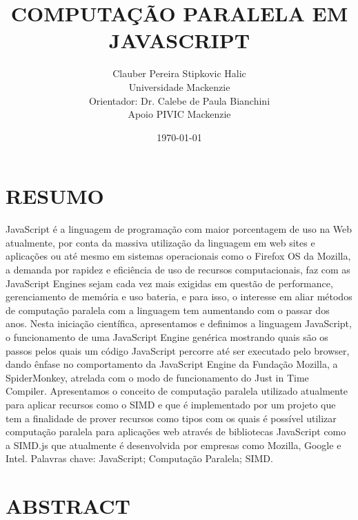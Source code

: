 \documentclass{article}
\begin{document}
\author{Clauber Pereira Stipkovic Halic\\
  Universidade Mackenzie\\
  Orientador: Dr. Calebe de Paula Bianchini\\
  Apoio PIVIC Mackenzie}
\date{\today}
\title{COMPUTAÇÃO PARALELA EM JAVASCRIPT}
\maketitle

\section{RESUMO}

JavaScript é a linguagem de programação com maior porcentagem de uso na Web
atualmente, por conta da massiva utilização da linguagem em web sites e aplicações ou até
mesmo em sistemas operacionais como o Firefox OS da Mozilla, a demanda por rapidez e
eficiência de uso de recursos computacionais, faz com as JavaScript Engines sejam cada
vez mais exigidas em questão de performance, gerenciamento de memória e uso bateria, e
para isso, o interesse em aliar métodos de computação paralela com a linguagem tem
aumentando com o passar dos anos. Nesta iniciação científica, apresentamos e definimos a
linguagem JavaScript, o funcionamento de uma JavaScript Engine genérica mostrando quais
são os passos pelos quais um código JavaScript percorre até ser executado pelo browser,
dando ênfase no comportamento da JavaScript Engine da Fundação Mozilla, a
SpiderMonkey, atrelada com o modo de funcionamento do Just in Time Compiler.
Apresentamos o conceito de computação paralela utilizado atualmente para aplicar recursos
como o SIMD e que é implementado por um projeto que tem a finalidade de prover recursos
como tipos com os quais é possível utilizar computação paralela para aplicações web
através de bibliotecas JavaScript como a SIMD.js que atualmente é desenvolvida por
empresas como Mozilla, Google e Intel.
Palavras chave: JavaScript; Computação Paralela; SIMD.

\section{ABSTRACT}
\end{document}
